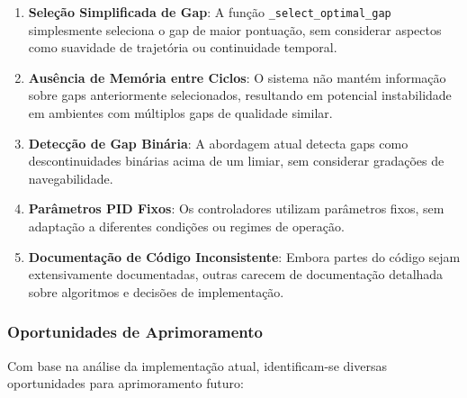 \begin{enumerate}
    \item \textbf{Seleção Simplificada de Gap}: A função \texttt{\_select\_optimal\_gap} simplesmente seleciona o gap de maior pontuação, sem considerar aspectos como suavidade de trajetória ou continuidade temporal.

    \item \textbf{Ausência de Memória entre Ciclos}: O sistema não mantém informação sobre gaps anteriormente selecionados, resultando em potencial instabilidade em ambientes com múltiplos gaps de qualidade similar.

    \item \textbf{Detecção de Gap Binária}: A abordagem atual detecta gaps como descontinuidades binárias acima de um limiar, sem considerar gradações de navegabilidade.

    \item \textbf{Parâmetros PID Fixos}: Os controladores utilizam parâmetros fixos, sem adaptação a diferentes condições ou regimes de operação.

    \item \textbf{Documentação de Código Inconsistente}: Embora partes do código sejam extensivamente documentadas, outras carecem de documentação detalhada sobre algoritmos e decisões de implementação.
\end{enumerate}

\subsubsection{Oportunidades de Aprimoramento}

Com base na análise da implementação atual, identificam-se diversas
oportunidades para aprimoramento futuro:

